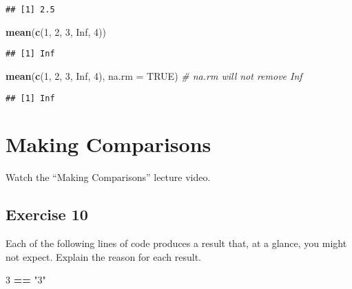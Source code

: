 \documentclass[
]{article}
\newenvironment{Shaded}{\begin{snugshade}}{\end{snugshade}}
\newcommand{\CommentTok}[1]{\textcolor[rgb]{0.56,0.35,0.01}{\textit{#1}}}
\newcommand{\DataTypeTok}[1]{\textcolor[rgb]{0.13,0.29,0.53}{#1}}
\newcommand{\DecValTok}[1]{\textcolor[rgb]{0.00,0.00,0.81}{#1}}
\newcommand{\KeywordTok}[1]{\textcolor[rgb]{0.13,0.29,0.53}{\textbf{#1}}}
\newcommand{\NormalTok}[1]{#1}
\newcommand{\OperatorTok}[1]{\textcolor[rgb]{0.81,0.36,0.00}{\textbf{#1}}}
\newcommand{\OtherTok}[1]{\textcolor[rgb]{0.56,0.35,0.01}{#1}}
\newcommand{\StringTok}[1]{\textcolor[rgb]{0.31,0.60,0.02}{#1}}
\begin{document}
\begin{verbatim}
## [1] 2.5
\end{verbatim}

\begin{Shaded}
\begin{Highlighting}[]
\KeywordTok{mean}\NormalTok{(}\KeywordTok{c}\NormalTok{(}\DecValTok{1}\NormalTok{, }\DecValTok{2}\NormalTok{, }\DecValTok{3}\NormalTok{, }\OtherTok{Inf}\NormalTok{, }\DecValTok{4}\NormalTok{))}
\end{Highlighting}
\end{Shaded}

\begin{verbatim}
## [1] Inf
\end{verbatim}

\begin{Shaded}
\begin{Highlighting}[]
\KeywordTok{mean}\NormalTok{(}\KeywordTok{c}\NormalTok{(}\DecValTok{1}\NormalTok{, }\DecValTok{2}\NormalTok{, }\DecValTok{3}\NormalTok{, }\OtherTok{Inf}\NormalTok{, }\DecValTok{4}\NormalTok{), }\DataTypeTok{na.rm =} \OtherTok{TRUE}\NormalTok{) }\CommentTok{\# na.rm will not remove Inf}
\end{Highlighting}
\end{Shaded}

\begin{verbatim}
## [1] Inf
\end{verbatim}

\hypertarget{making-comparisons}{%
\section{Making Comparisons}\label{making-comparisons}}

Watch the ``Making Comparisons'' lecture video.

\hypertarget{exercise-10}{%
\subsection{Exercise 10}\label{exercise-10}}

Each of the following lines of code produces a result that, at a glance,
you might not expect. Explain the reason for each result.

\begin{Shaded}
\begin{Highlighting}[]
\DecValTok{3} \OperatorTok{==}\StringTok{ "3"}
\end{Highlighting}
\end{Shaded}
\end{document}
